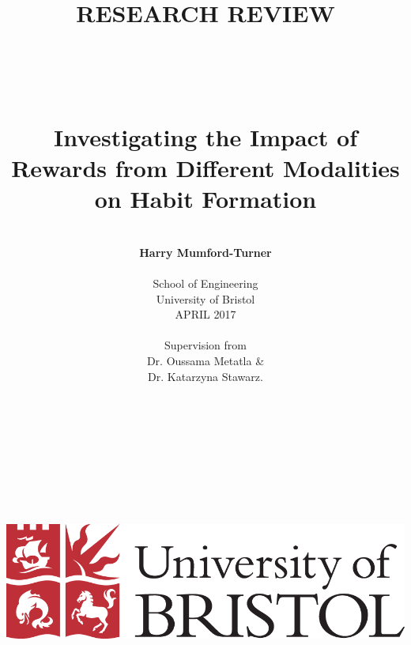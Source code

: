 \date{} %


\title{\large{RESEARCH REVIEW}
\\
\huge{\textbf{\\\\\\Investigating the Impact of Rewards from Different Modalities on Habit Formation}}}
\author{\\
\textbf{Harry Mumford-Turner}\\
\\
School of Engineering\\
University of Bristol\\
APRIL 2017\\
\\
Supervision from\\
Dr. Oussama Metatla \&\\Dr. Katarzyna Stawarz.
\\
\\\\
\\
\\
\\
\\
\\
\\
\\
\includegraphics[scale=0.29]{resources/UoB-logo.png}}
